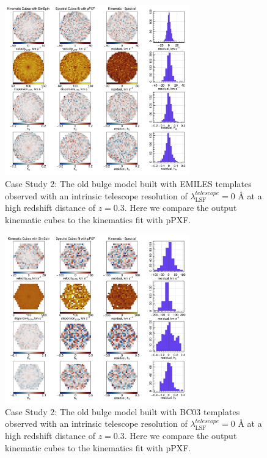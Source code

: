 \documentclass[
  journal=pasa,
  manuscript=research-paper, %
  year=2020,
  volume=37,
]{cup-journal}
\begin{document}
\begin{figure}
    \centering
    \includegraphics[keepaspectratio, width=8cm]{Figures/cs2_old_bulge_velocities_highz_EMILES.jpeg}
    \caption{Case Study 2: The old bulge model built with EMILES templates observed with an intrinsic telescope resolution of  $\lambda_{\text{LSF}}^{telescope} = 0$ \AA{} at a high redshift distance of $z = 0.3$. Here we compare the output kinematic cubes to the kinematics fit with pPXF.}
    \label{fig:cs2_oldbulge_EMILES}
\end{figure}

\begin{figure}
    \centering
    \includegraphics[keepaspectratio, width=8cm]{Figures/cs2_old_bulge_velocities_highz_BC03hr.jpeg}
    \caption{Case Study 2: The old bulge model built with BC03 templates observed with an intrinsic telescope resolution of  $\lambda_{\text{LSF}}^{telescope} = 0$ \AA{} at a high redshift distance of $z = 0.3$. Here we compare the output kinematic cubes to the kinematics fit with pPXF.}
    \label{fig:cs2_oldbulge_BC03}
\end{figure}

\FloatBarrier
\end{document}
